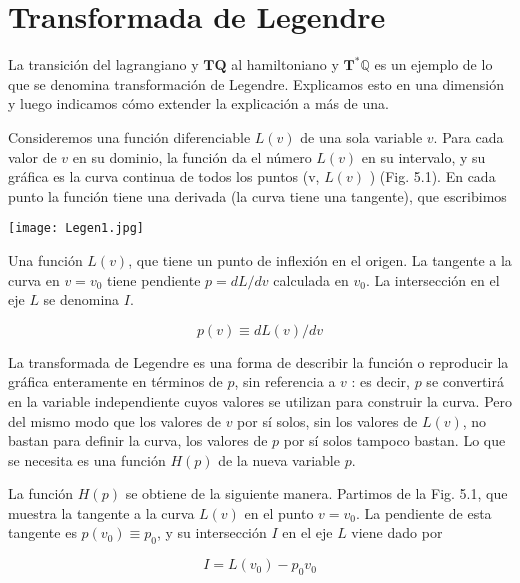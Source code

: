 \setchapterpreamble[u]{\margintoc}
\chapter{Transformada de Legendre}


La transición del lagrangiano y $\mathbf{T Q}$ al hamiltoniano y $\mathbf{T}^{*} \mathbb{Q}$ es un ejemplo de lo que se denomina transformación de Legendre. Explicamos esto en una dimensión y luego indicamos cómo extender la explicación a más de una.

Consideremos una función diferenciable $L(v)$ de una sola variable $v$. Para cada valor de $v$ en su dominio, la función da el número $L(v)$ en su intervalo, y su gráfica es la curva continua de todos los puntos (v, $L(v)$ ) (Fig. 5.1). En cada punto la función tiene una derivada (la curva tiene una tangente), que escribimos

\begin{marginfigure}[]
  
  \texttt{[image: Legen1.jpg]}
  \caption[]{Una función $L(v)$, que tiene un punto de inflexión en el origen. La tangente a la curva en $v=v_{0}$ tiene pendiente $p=d L / d v$ calculada en $v_{0}$. La intersección en el eje $L$ se denomina $I$.}
\end{marginfigure}

\begin{equation*}
  p(v) \equiv d L(v) / d v \tag{5.36}
\end{equation*}

\begin{definition}
  La transformada de Legendre es una forma de describir la función o reproducir la gráfica enteramente en términos de $p$, sin referencia a $v$ : es decir, $p$ se convertirá en la variable independiente cuyos valores se utilizan para construir la curva. Pero del mismo modo que los valores de $v$ por sí solos, sin los valores de $L(v)$, no bastan para definir la curva, los valores de $p$ por sí solos tampoco bastan. Lo que se necesita es una función $H(p)$ de la nueva variable $p$.
\end{definition}


La función $H(p)$ se obtiene de la siguiente manera. Partimos de la Fig. 5.1, que muestra la tangente a la curva $L(v)$ en el punto $v=v_{0}$. La pendiente de esta tangente es $p\left(v_{0}\right) \equiv p_{0}$, y su intersección $I$ en el eje $L$ viene dado por

\[I=L\left(v_{0}\right)-p_{0} v_{0}\]

